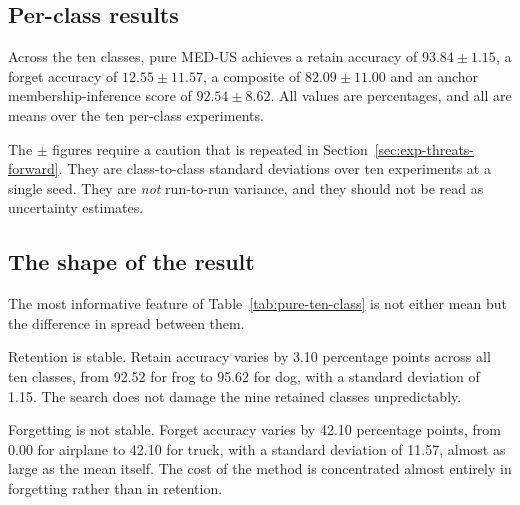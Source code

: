\subsection{Per-class results}

\begin{table}[htbp]
  \centering
  \caption{Pure MED-US across all ten CIFAR-10 classes. Every row is gradient-free
  weight surgery. $C^{*}$ was selected by one rule applied uniformly: the front
  member maximising the composite $\mathrm{ACC}_r \times (1 - \mathrm{ACC}_f)$.}
  \label{tab:pure-ten-class}
\end{table}

Across the ten classes, pure MED-US achieves a retain accuracy of
$93.84 \pm 1.15$, a forget accuracy of $12.55 \pm 11.57$, a composite of
$82.09 \pm 11.00$ and an anchor membership-inference score of $92.54 \pm 8.62$.
All values are percentages, and all are means over the ten per-class experiments.

The $\pm$ figures require a caution that is repeated in
Section~\ref{sec:exp-threats-forward}. They are class-to-class standard
deviations over ten experiments at a single seed. They are \emph{not} run-to-run
variance, and they should not be read as uncertainty estimates.

\subsection{The shape of the result}

The most informative feature of Table~\ref{tab:pure-ten-class} is not either mean
but the difference in spread between them.

Retention is stable. Retain accuracy varies by 3.10 percentage points across all
ten classes, from 92.52 for frog to 95.62 for dog, with a standard deviation of
1.15. The search does not damage the nine retained classes unpredictably.

Forgetting is not stable. Forget accuracy varies by 42.10 percentage points, from
0.00 for airplane to 42.10 for truck, with a standard deviation of 11.57, almost
as large as the mean itself. The cost of the method is concentrated almost
entirely in forgetting rather than in retention.

